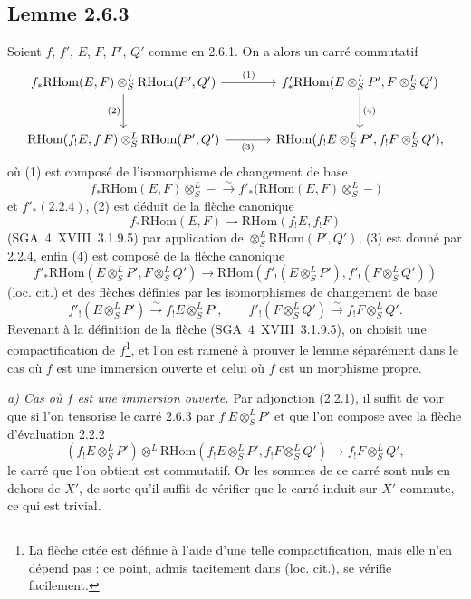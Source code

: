 \documentclass[11pt]{article}
\providecommand{\RHom}{\mathrm{RHom}}
\providecommand{\RHom}{\mathrm{RHom}}
\providecommand{\RHom}{\mathrm R\mathcal{H}om}
\begin{document}
\subsection*{Lemme 2.6.3}
Soient $f$, $f'$, $E$, $F$, $P'$, $Q'$ comme en 2.6.1. On a alors un carré commutatif
\[
\begin{tikzcd}[column sep=large,row sep=large]
f_*\RHom(E,F)\otimes^L_S\RHom(P',Q') \arrow[r,"(1)"] \arrow[d,"(2)"'] & f'_*\RHom(E\otimes^L_SP',F\otimes^L_SQ') \arrow[d,"(4)"]\\
\RHom(f_!E,f_!F)\otimes^L_S\RHom(P',Q') \arrow[r,"(3)"'] & \RHom(f_!E\otimes^L_SP',f_!F\otimes^L_SQ'),
\end{tikzcd}
\]
où (1) est composé de l'isomorphisme de changement de base
\[
f_*\RHom(E,F)\otimes^L_S -\xrightarrow{\sim}f'_*\bigl(\RHom(E,F)\otimes^L_S-\bigr)
\]
et $f'_*(2.2.4)$, (2) est déduit de la flèche canonique
\[
f_*\RHom(E,F)\longrightarrow\RHom(f_!E,f_!F)
\]
(SGA~4~XVIII~3.1.9.5) par application de $\otimes^L_S\RHom(P',Q')$, (3) est donné par 2.2.4, enfin (4) est composé de la flèche canonique
\[
f'_*\RHom(E\otimes^L_SP',F\otimes^L_SQ')
\longrightarrow
\RHom(f'_!(E\otimes^L_SP'),f'_!(F\otimes^L_SQ'))
\]
(loc. cit.) et des flèches définies par les isomorphismes de changement de base
\[
f'_!(E\otimes^L_SP')\xrightarrow{\sim}f_!E\otimes^L_SP',
\qquad
f'_!(F\otimes^L_SQ')\xrightarrow{\sim}f_!F\otimes^L_SQ'.
\]
Revenant à la définition de la flèche (SGA~4~XVIII~3.1.9.5), on choisit une compactification de $f$\footnote{La flèche citée est définie à l'aide d'une telle compactification, mais elle n'en dépend pas : ce point, admis tacitement dans (loc. cit.), se vérifie facilement.}, et l'on est ramené à prouver le lemme séparément dans le cas où $f$ est une immersion ouverte et celui où $f$ est un morphisme propre.

\emph{a) Cas où $f$ est une immersion ouverte.} Par adjonction (2.2.1), il suffit de voir que si l'on tensorise le carré 2.6.3 par $f_!E\otimes^L_SP'$ et que l'on compose avec la flèche d'évaluation 2.2.2
\[
(f_!E\otimes^L_SP')\otimes^L\RHom(f_!E\otimes^L_SP',f_!F\otimes^L_SQ')\longrightarrow f_!F\otimes^L_SQ',
\]
le carré que l'on obtient est commutatif. Or les sommes de ce carré sont nuls en dehors de $X'$, de sorte qu'il suffit de vérifier que le carré induit sur $X'$ commute, ce qui est trivial.
\end{document}
